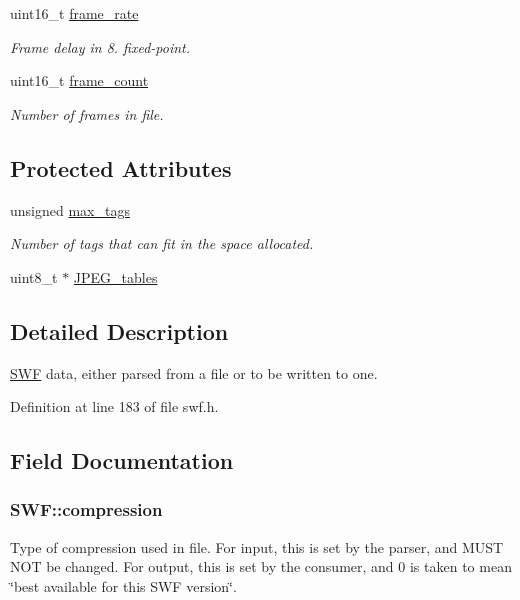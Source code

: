 \begin{DoxyCompactItemize}
uint16\+\_\+t \hyperlink{struct_s_w_f_aa2c564fe1b703896a7970287cc0a131a}{frame\+\_\+rate}
\begin{DoxyCompactList}\small\item\em Frame delay in 8. fixed-\/point. \end{DoxyCompactList}\item 
uint16\+\_\+t \hyperlink{struct_s_w_f_aad31257e9575ac95fdfdbaaf3505d65b}{frame\+\_\+count}
\begin{DoxyCompactList}\small\item\em Number of frames in file. \end{DoxyCompactList}\end{DoxyCompactItemize}
\subsection*{Protected Attributes}
\begin{DoxyCompactItemize}
\item 
unsigned \hyperlink{struct_s_w_f_a341ef0cf50f79cad21ae0db9fe483dc1}{max\+\_\+tags}
\begin{DoxyCompactList}\small\item\em Number of tags that can fit in the space allocated. \end{DoxyCompactList}\item 
uint8\+\_\+t $\ast$ \hyperlink{struct_s_w_f_ae63eda75022e0100a17e78b200d607a4}{J\+P\+E\+G\+\_\+tables}
\end{DoxyCompactItemize}


\subsection{Detailed Description}
\hyperlink{struct_s_w_f}{S\+W\+F} data, either parsed from a file or to be written to one. 

Definition at line 183 of file swf.\+h.



\subsection{Field Documentation}
\hypertarget{struct_s_w_f_a6431142bed21f16383a18d8a3f8a19d1}{}
\subsubsection[{compression}]{ S\+W\+F\+::compression}\label{struct_s_w_f_a6431142bed21f16383a18d8a3f8a19d1}
Type of compression used in file. For input, this is set by the parser, and M\+U\+S\+T N\+O\+T be changed. For output, this is set by the consumer, and 0 is taken to mean \char`\"{}best available for this S\+W\+F version\char`\"{}. 

